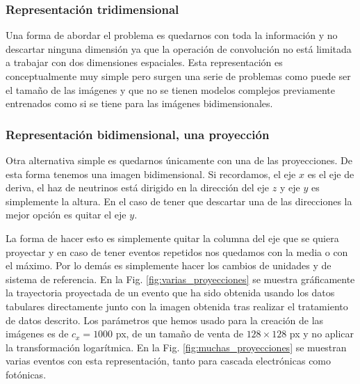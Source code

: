 \documentclass[a4paper,12pt,twoside,titlepage]{article}
\begin{document}
\subsubsection*{Representación tridimensional}

Una forma de abordar el problema es quedarnos con toda la información y no descartar ninguna dimensión ya que la operación de convolución no está limitada a trabajar con dos dimensiones espaciales. Esta representación es conceptualmente muy simple pero surgen una serie de problemas como puede ser el tamaño de las imágenes y que no se tienen modelos complejos previamente entrenados como si se tiene para las imágenes bidimensionales.

\subsubsection*{Representación bidimensional, una proyección}

Otra alternativa simple es quedarnos únicamente con una de las proyecciones. De esta forma tenemos una imagen bidimensional. Si recordamos, el eje $x$ es el eje de deriva, el haz de neutrinos está dirigido en la dirección del eje $z$ y eje $y$ es simplemente la altura. En el caso de tener que descartar una de las direcciones la mejor opción es quitar el eje $y$.

La forma de hacer esto es simplemente quitar la columna del eje que se quiera proyectar y en caso de tener eventos repetidos nos quedamos con la media o con el máximo. Por lo demás es simplemente hacer los cambios de unidades y de sistema de referencia. En la Fig. \ref{fig:varias_proyecciones} se muestra gráficamente la trayectoria proyectada de un evento que ha sido obtenida usando los datos tabulares directamente junto con la imagen obtenida tras realizar el tratamiento de datos descrito. Los parámetros que hemos usado para la creación de las imágenes es de $c_x = 1000$ px, de un tamaño de venta de $128\times 128$ px y no aplicar la transformación logarítmica. En la Fig. \ref{fig:muchas_proyecciones} se muestran varias eventos con esta representación, tanto para cascada electrónicas como fotónicas.
\end{document}

